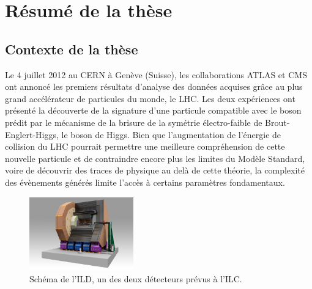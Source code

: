\chapter{Résumé de la thèse}


  \section{Contexte de la thèse}

  Le 4 juillet 2012 au CERN à Genève (Suisse), les collaborations ATLAS et CMS ont annoncé les premiers résultats d'analyse des données acquises grâce au plus grand accélérateur de particules du monde, le \acrfull{LHC}\cite{Aad2012}\cite{Chatrchyan2012}. 
  Les deux expériences ont présenté la découverte de la signature d'une particule compatible avec le boson prédit par le mécanisme de la brisure de la symétrie électro-faible de Brout-Englert-Higgs, le boson de Higgs.
  Bien que l'augmentation de l'énergie de collision du LHC pourrait permettre une meilleure compréhension de cette nouvelle particule et de contraindre encore plus les limites du Modèle Standard, voire de découvrir des traces de physique au delà de cette théorie, la complexité des évènements générés limite l'accès à certains paramètres fondamentaux.
  
  \begin{figure}[!h]
    \centering
    \includegraphics[width = 0.4\textwidth]{Pictures/ILC/ILD.jpg}
    \caption{Schéma de l'ILD, un des deux détecteurs prévus à l'ILC.}
    \label{fig:ILD_resume}
  \end{figure}
 
